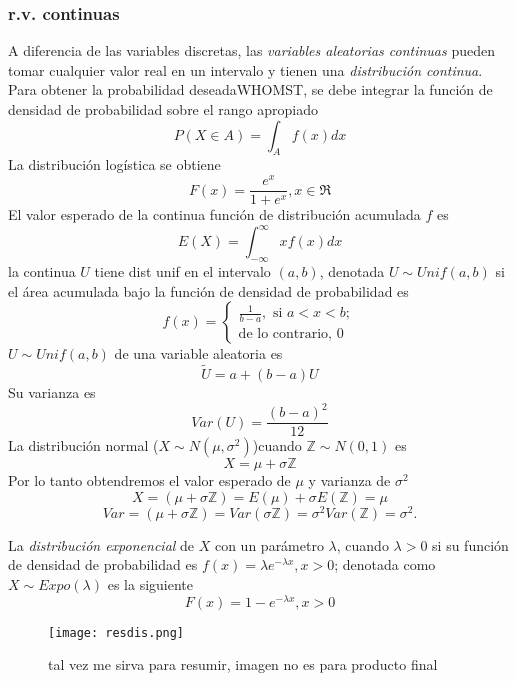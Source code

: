 \documentclass[letterpaper]{article}
\begin{document}
\subsubsection{r.v. continuas}
A diferencia de las variables discretas, las \emph{variables aleatorias continuas} pueden tomar cualquier valor real en un intervalo y tienen una \emph{distribución continua}. Para obtener la probabilidad deseadaWHOMST, se debe integrar la función de densidad de probabilidad sobre el rango apropiado
\begin{equation}
P(X\in A)=\int_{A}f(x)dx
\end{equation}
La distribución logística se obtiene
\begin{equation}
F(x)=\frac{e^x}{1+e^x}, x\in\Re
\end{equation}
El valor esperado de la continua función de distribución acumulada $f$ es
\begin{equation}
E(X)=\int_{-\infty}^{\infty}xf(x)dx
\end{equation}
la continua $U$ tiene dist unif en el intervalo $(a,b)$, denotada $U \sim Unif(a,b)$ si el área acumulada bajo la función de densidad de probabilidad es
\begin{equation}
f(x)=\begin{cases}
\frac{1}{b-a},\text{ si }a<x<b;\\
\text{de lo contrario, }0
\end{cases}
\end{equation}
$U \sim Unif(a,b)$ de una variable aleatoria es
\begin{equation}
\tilde{U}=a+(b-a)U
\end{equation}
Su varianza es
\begin{equation}
Var(U)=\frac{{(b-a)}^2}{12}
\end{equation}
La distribución normal ($X \sim N(\mu,\sigma^2)$)cuando $\mathbb{Z} \sim N(0,1)$ es
\begin{equation}
X=\mu+\sigma\mathbb{Z}
\end{equation}
Por lo tanto obtendremos el valor esperado de $\mu$ y varianza de $\sigma^2$
\begin{equation}
X=(\mu+\sigma\mathbb{Z})=E(\mu)+\sigma E(\mathbb{Z})=\mu
\end{equation}
\begin{equation}
Var=(\mu+\sigma\mathbb{Z})=Var(\sigma\mathbb{Z})=\sigma^2Var(\mathbb{Z})=\sigma^2.
\end{equation}

La \emph{distribución exponencial} de $X$ con un parámetro $\lambda$, cuando $\lambda>0$ si su función de densidad de probabilidad es $f(x)=\lambda e^{-\lambda x} , x>0$; denotada como $X \sim Expo(\lambda)$ es la siguiente
\begin{equation}
F(x)=1-e^{-\lambda x}, x>0
\end{equation}
\begin{figure}[H]\centering
\texttt{[image: resdis.png]}
\caption{tal vez me sirva para resumir, imagen no es para producto final}
\end{figure}
\end{document}
